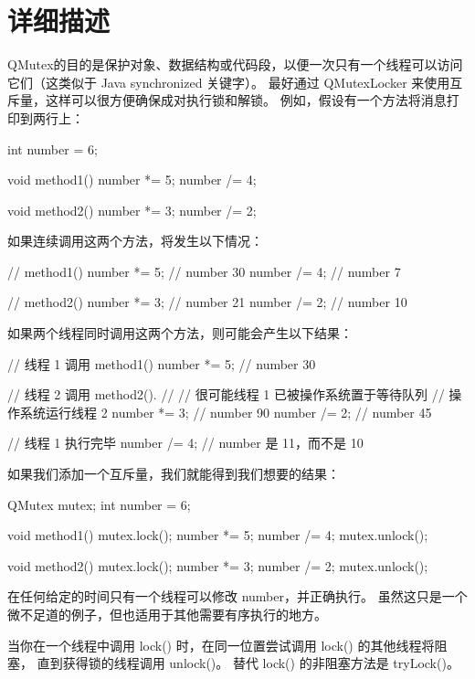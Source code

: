 \section{详细描述}

QMutex的目的是保护对象、数据结构或代码段，以便一次只有一个线程可以访问它们（这类似于 Java synchronized 关键字）。
最好通过 QMutexLocker 来使用互斥量，这样可以很方便确保成对执行锁和解锁。
例如，假设有一个方法将消息打印到两行上：

\begin{cppcode}
int number = 6;

void method1()
{
    number *= 5;
    number /= 4;
}

void method2()
{
    number *= 3;
    number /= 2;
}
\end{cppcode}

如果连续调用这两个方法，将发生以下情况：

\begin{cppcode}
// method1()
number *= 5;        // number 30
number /= 4;        // number  7

// method2()
number *= 3;        // number 21
number /= 2;        // number 10
\end{cppcode}

如果两个线程同时调用这两个方法，则可能会产生以下结果：

\begin{cppcode}
// 线程 1 调用 method1()
number *= 5;        // number 30

// 线程 2 调用 method2().
//
// 很可能线程 1 已被操作系统置于等待队列
// 操作系统运行线程 2
number *= 3;        // number 90
number /= 2;        // number 45

// 线程 1 执行完毕
number /= 4;        // number 是 11，而不是 10
\end{cppcode}

如果我们添加一个互斥量，我们就能得到我们想要的结果：

\begin{cppcode}
QMutex mutex;
int number = 6;

void method1()
{
    mutex.lock();
    number *= 5;
    number /= 4;
    mutex.unlock();
}

void method2()
{
    mutex.lock();
    number *= 3;
    number /= 2;
    mutex.unlock();
}
\end{cppcode}

在任何给定的时间只有一个线程可以修改 number，并正确执行。
虽然这只是一个微不足道的例子，但也适用于其他需要有序执行的地方。

当你在一个线程中调用 lock() 时，在同一位置尝试调用 lock() 的其他线程将阻塞，
直到获得锁的线程调用 unlock()。
替代 lock() 的非阻塞方法是 tryLock()。

